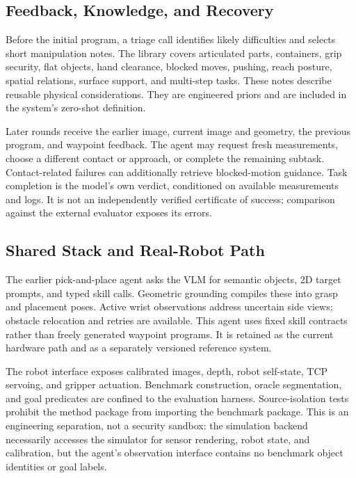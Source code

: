 \subsection{Feedback, Knowledge, and Recovery}
Before the initial program, a triage call identifies likely difficulties and selects short manipulation notes. The library covers articulated parts, containers, grip security, flat objects, hand clearance, blocked moves, pushing, reach posture, spatial relations, surface support, and multi-step tasks. These notes describe reusable physical considerations. They are engineered priors and are included in the system's zero-shot definition.

Later rounds receive the earlier image, current image and geometry, the previous program, and waypoint feedback. The agent may request fresh measurements, choose a different contact or approach, or complete the remaining subtask. Contact-related failures can additionally retrieve blocked-motion guidance. Task completion is the model's own verdict, conditioned on available measurements and logs. It is not an independently verified certificate of success; comparison against the external evaluator exposes its errors.

\subsection{Shared Stack and Real-Robot Path}
The earlier pick-and-place agent asks the VLM for semantic objects, 2D target prompts, and typed skill calls. Geometric grounding compiles these into grasp and placement poses. Active wrist observations address uncertain side views; obstacle relocation and retries are available. This agent uses fixed skill contracts rather than freely generated waypoint programs. It is retained as the current hardware path and as a separately versioned reference system.

The robot interface exposes calibrated images, depth, robot self-state, TCP servoing, and gripper actuation. Benchmark construction, oracle segmentation, and goal predicates are confined to the evaluation harness. Source-isolation tests prohibit the method package from importing the benchmark package. This is an engineering separation, not a security sandbox: the simulation backend necessarily accesses the simulator for sensor rendering, robot state, and calibration, but the agent's observation interface contains no benchmark object identities or goal labels.
